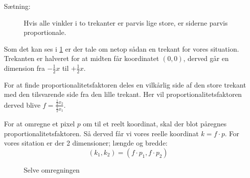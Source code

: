 \begin{description}
\item[Sætning:]{Hvis alle vinkler i to trekanter er parvis lige store, er siderne parvis proportionale.}
\end{description}
Som det kan ses i \cref{fig:udregningstrekant} er der tale om netop sådan en trekant for vores situation.
Trekanten er halveret for at midten får koordinatet $(0,0)$, derved går en dimension fra $-\frac{1}{2}x$ til $+\frac{1}{2}x$.

For at finde proportionalitetsfaktoren deles en vilkårlig side af den store trekant med den tilsvarende side fra den lille trekant.
Her vil proportionalitetsfaktoren derved blive $f = \frac{\frac{1}{2}x_2}{\frac{1}{2}x_1}$.

For at omregne et pixel $p$ om til et reelt koordinat, skal der blot påregnes proportionalitetsfaktoren.
Så derved får vi vores reelle koordinat $k = f \cdot p$.
For vores sitation er der 2 dimensioner; længde og bredde: \begin{equation*}
(k_1,k_2) = (f \cdot p_1, f \cdot p_2)
\end{equation*}


\begin{figure}[h]
\centering
{}
\caption{Selve omregningen}
\label{fig:udregningstrekant}
\end{figure}